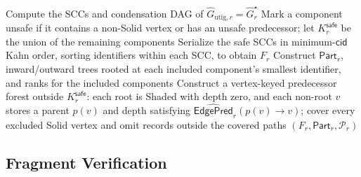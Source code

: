 \begin{algorithm}[h!]
\caption{\textsc{SafeExtract}: Expanded Safe Extraction}
\label{alg:safe-extract}
\footnotesize
{}
Compute the SCCs and condensation DAG of
$\widehat G_{\mathrm{utig},r}=\widehat G_r^\star$\;
Mark a component unsafe if it contains a non-Solid vertex or has an unsafe predecessor; let $K_r^{\mathsf{safe}}$ be the union of the remaining components\;
Serialize the safe SCCs in minimum-$\mathsf{cid}$ Kahn order, sorting identifiers within each SCC, to obtain $F_r$\;
Construct $\mathsf{Part}_r$, inward/outward trees rooted at each included
component's smallest identifier, and ranks for the included components\;
Construct a vertex-keyed predecessor forest outside $K_r^{\mathsf{safe}}$:
each root is Shaded with depth zero, and each non-root $v$ stores a parent $p(v)$ and depth satisfying $\widehat{\mathsf{EdgePred}}_r(p(v)\to v)$;
cover every excluded Solid vertex and omit records outside the covered paths\;
\KwRet $(F_r,\mathsf{Part}_r,\mathcal P_r)$
\end{algorithm}

\subsection{Fragment Verification}


